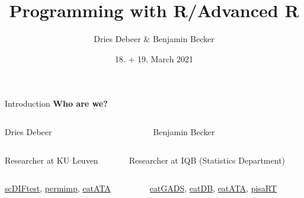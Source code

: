 \documentclass[xcolor=table]{beamer}\usepackage[]{graphicx}\usepackage[]{color}
\begin{document}

\title{Programming with R/Advanced R}


\author[Dries Debeer \& Benjamin Becker]{Dries Debeer \& Benjamin Becker}
\date{18. + 19. March 2021}


\begin{frame}
\titlepage
\end{frame}
\addtocounter{framenumber}{-1}

\begin{frame}{Introduction}
\textbf{Who are we?}

\begin{columns}[t]
\begin{column}{.475\textwidth}
\textcolor{mLightBrown}{Dries Debeer}
\end{column}
  \begin{column}{.475\textwidth}
    \textcolor{mLightBrown}{Benjamin Becker}
  \end{column}
\end{columns}

\begin{columns}[t]
\begin{column}{.475\textwidth}
Researcher at KU Leuven
  	
\end{column}
\begin{column}{.475\textwidth}
Researcher at IQB (Statistics Department)

  \end{column}
\end{columns}

\vspace{0.5cm}

\begin{columns}[t]
\begin{column}{.475\textwidth}
\href{https://github.com/ddebeer/scDIFtest}{scDIFtest}, \href{https://github.com/ddebeer/permimp}{permimp}, \href{https://github.com/beckerbenj/eatATA}{eatATA}
  	
\end{column}
\begin{column}{.475\textwidth}
\href{https://github.com/beckerbenj/eatGADS}{eatGADS}, \href{https://github.com/beckerbenj/eatDB}{eatDB}, \href{https://github.com/beckerbenj/eatATA}{eatATA}, \href{https://github.com/beckerbenj/pisaRT}{pisaRT}

  \end{column}
\end{columns}


\end{frame}
\end{document}
